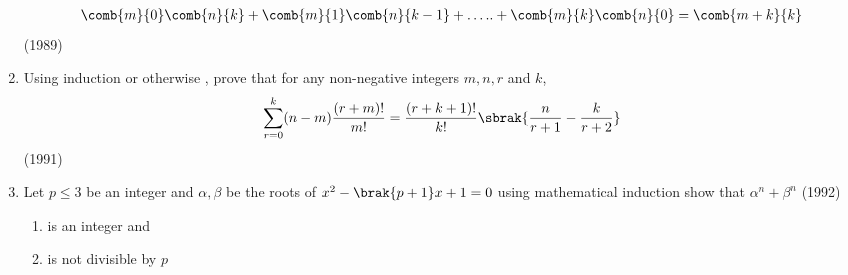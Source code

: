 \begin{enumerate}[label=\thesubsection.\arabic*,ref=\thesubsection.\theenumi]
		    \begin{align*} \comb{m}{0}\comb{n}{k} +\comb{m}{1}\comb{n}{k-1}+\dots..+\comb{m}{k}\comb{n}{0} =\comb{m+k}{k} \end{align*}  \hfill{(1989)}
 \item Using induction or otherwise , prove that for any non-negative integers $m,n,r$ and $ k$,
		    \begin{align*} 
			    \sum_{r=0}^{k}(n-m)\frac{(r+m)!}{m!}= \frac{(r+k+1)!}{k!}\sbrak{\frac{n}{r+1}-\frac{k}{r+2}}
		    \end{align*}
		     \hfill{(1991)} 
  \item Let $ p \leq 3 $ be an integer and $ \alpha , \beta $ be  the roots of $ x^2-\brak{p+1}x+1=0 $ using mathematical induction show that $ \alpha^n  + \beta^n $ \hfill{(1992)}
		    \begin{enumerate}[label=(\roman*)]

			    \item is an integer and   
		    \item is not divisible by $ p $ \end{enumerate}
				    
\end{enumerate}

